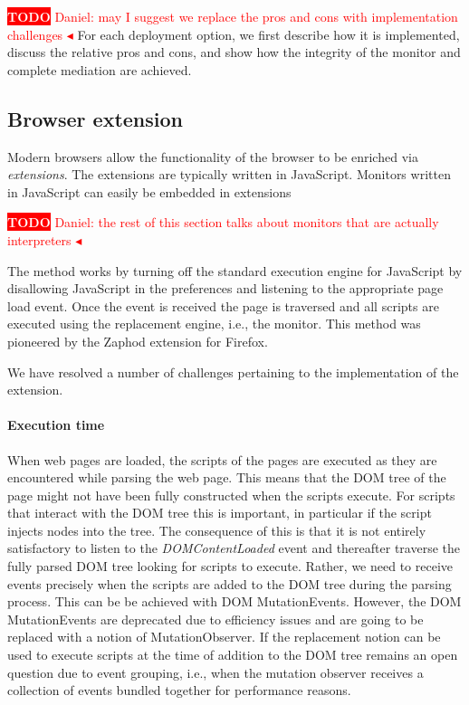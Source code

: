 \documentclass{llncs}
\newcommand{\todo}[1]{\colorbox{red}{\textcolor{white}{\sffamily\bfseries\scriptsize TODO}} \textcolor{red}{#1} \textcolor{red}{$\blacktriangleleft$}}
\begin{document}
\todo{Daniel: may I suggest we replace the pros and cons with implementation challenges}
For each deployment option, we first describe how it is implemented,
discuss the relative pros and cons, and show how the integrity of the monitor
and complete mediation are achieved.


\subsection{Browser extension}

Modern browsers allow the functionality of the browser to be enriched via
\emph{extensions}. The extensions are typically written in JavaScript.  
Monitors written in JavaScript can easily be embedded in extensions

\todo{Daniel: the rest of this section talks about monitors that are actually interpreters}

The method works by turning off the standard execution engine for JavaScript
by disallowing JavaScript in the preferences and listening to the appropriate
page load event. Once the event is received the page is traversed and all
scripts are executed using the replacement engine, i.e., the monitor. This
method was pioneered by the Zaphod \cite{Zaphod} extension for Firefox.

We have resolved a number of challenges pertaining to the implementation of the
extension.

\paragraph{Execution time}

When web pages are loaded, the scripts of the pages are executed as they are
encountered while parsing the web page. This means that the DOM tree of the
page might not have been fully constructed when the scripts execute.  For
scripts that interact with the DOM tree this is important, in particular if the
script injects nodes into the tree. The consequence of this is that it is not
entirely satisfactory to listen to the \emph{DOMContentLoaded} event and
thereafter traverse the fully parsed DOM tree looking for scripts to execute.
Rather, we need to receive events precisely when the scripts are added to the
DOM tree during the parsing process. This can be be achieved with DOM
MutationEvents. However, the DOM MutationEvents are deprecated due to
efficiency issues and are going to be replaced with a notion of
MutationObserver.  If the replacement notion can be used to execute scripts at
the time of addition to the DOM tree remains an open question due to event
grouping, i.e., when the mutation observer receives a collection of events
bundled together for performance reasons. 
\end{document}
